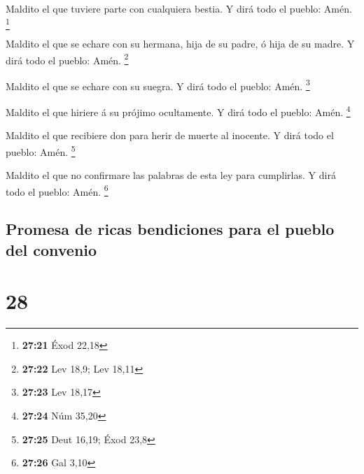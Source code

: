  Maldito el que tuviere parte con cualquiera bestia. Y dirá
todo el pueblo: Amén. \footnote{\textbf{27:21} Éxod 22,18}

 Maldito el que se echare con su hermana, hija de su padre,
ó hija de su madre. Y dirá todo el pueblo: Amén. \footnote{\textbf{27:22}
  Lev 18,9; Lev 18,11}

 Maldito el que se echare con su suegra. Y dirá todo el
pueblo: Amén. \footnote{\textbf{27:23} Lev 18,17}

 Maldito el que hiriere á su prójimo ocultamente. Y dirá
todo el pueblo: Amén. \footnote{\textbf{27:24} Núm 35,20}

 Maldito el que recibiere don para herir de muerte al
inocente. Y dirá todo el pueblo: Amén. \footnote{\textbf{27:25} Deut
  16,19; Éxod 23,8}

 Maldito el que no confirmare las palabras de esta ley para
cumplirlas. Y dirá todo el pueblo: Amén. \footnote{\textbf{27:26} Gal
  3,10}

\hypertarget{promesa-de-ricas-bendiciones-para-el-pueblo-del-convenio}{%
\subsection{Promesa de ricas bendiciones para el pueblo del
convenio}\label{promesa-de-ricas-bendiciones-para-el-pueblo-del-convenio}}

\hypertarget{section-27}{%
\section{28}\label{section-27}}

